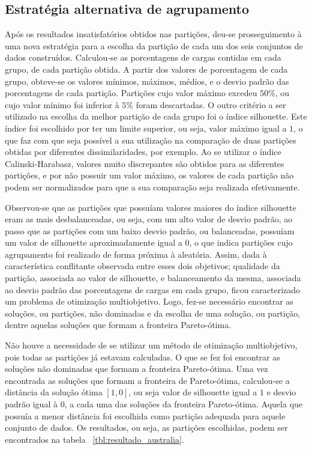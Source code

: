 \subsection{Estratégia alternativa de agrupamento}

Após os resultados insatisfatórios obtidos nas partições, deu-se prosseguimento à uma nova estratégia para a escolha da partição de cada um dos seis conjuntos de dados construídos. Calculou-se as porcentagens de cargas  contidas em cada grupo, de cada partição obtida. A partir dos valores de porcentagem de cada grupo, obteve-se os valores mínimos, máximos, médios, e o desvio padrão das porcentagens de cada partição. Partições cujo valor máximo excedeu $50\%$, ou cujo valor mínimo foi inferior à $5\%$ foram descartadas. O outro critério a ser utilizado na escolha da melhor partição de cada grupo foi o índice silhouette. Este índice foi escolhido por ter um limite superior, ou seja, valor máximo igual a $1$, o que faz com que seja possível a sua utilização na comparação de duas partições obtidas por diferentes dissimilaridades, por exemplo. Ao se utilizar o índice Calinski-Harabasz, valores muito discrepantes são obtidos para as diferentes partições, e por não possuir um valor máximo, os valores de cada partição não podem ser normalizados para que a sua comparação seja realizada efetivamente.

Observou-se que as partições que possuíam valores maiores do índice silhouette eram as mais desbalanceadas, ou seja, com um alto valor de desvio padrão, ao passo que as partições com um baixo desvio padrão, ou balanceadas, possuíam um valor de silhouette aproximadamente igual a $0$, o que indica partições cujo agrupamento foi realizado de forma próxima à aleatória. Assim, dada à característica conflitante observada entre esses dois objetivos; qualidade da partição, associada ao valor de silhouette, e balanceamento da mesma, associada ao desvio padrão das porcentagens de cargas em cada grupo, ficou caracterizado um problema de otimização multiobjetivo. Logo, fez-se necessário encontrar as soluções, ou partições, não dominadas e da escolha de uma solução, ou partição, dentre aquelas soluções que formam a fronteira Pareto-ótima.

Não houve a necessidade de se utilizar um método de otimização multiobjetivo, pois todas as  partições já estavam calculadas. O que se fez foi encontrar as soluções não dominadas que formam a fronteira Pareto-ótima. Uma vez encontrada as soluções que formam a fronteira de Pareto-ótima, calculou-se a distância da solução ótima $[1,0]$, ou seja valor de silhouette igual a $1$ e desvio padrão igual à $0$, a cada uma das soluções da fronteira Pareto-ótima. Aquela que possuía a menor distância foi escolhida como partição adequada para aquele conjunto de dados. Os resultados, ou seja, as partições escolhidas, podem ser encontrados na tabela ~\ref{tbl:resultado_australia}.

